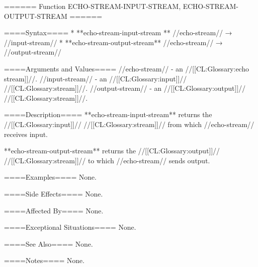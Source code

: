 ====== Function ECHO-STREAM-INPUT-STREAM, ECHO-STREAM-OUTPUT-STREAM ======

====Syntax====
  * **echo-stream-input-stream ** //echo-stream// → //input-stream// 
  * **echo-stream-output-stream** //echo-stream// → //output-stream//

====Arguments and Values====
//echo-stream// - an //[[CL:Glossary:echo stream]]//.
//input-stream// - an //[[CL:Glossary:input]]// //[[CL:Glossary:stream]]//.
//output-stream// - an //[[CL:Glossary:output]]// //[[CL:Glossary:stream]]//.

====Description====
**echo-stream-input-stream** returns the //[[CL:Glossary:input]]// //[[CL:Glossary:stream]]// from which //echo-stream// receives input.

**echo-stream-output-stream** returns the //[[CL:Glossary:output]]// //[[CL:Glossary:stream]]// to which //echo-stream// sends output.

====Examples====
None.

====Side Effects====
None.

====Affected By====
None.

====Exceptional Situations====
None.

====See Also====
None.

====Notes====
None.

